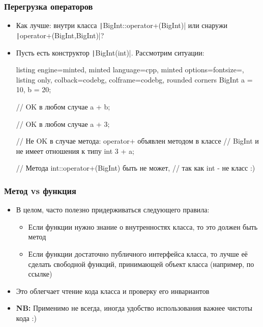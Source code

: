 \documentclass[10pt]{beamer}
\begin{document}
\begin{frame}[fragile]
\frametitle{Перегрузка операторов}
\begin{itemize}
\item Как лучше: внутри класса \texttt|BigInt::operator+(BigInt)| или снаружи \texttt|operator+(BigInt,BigInt)|?
\pause
\item Пусть есть конструктор \texttt|BigInt(int)|. Рассмотрим ситуации:
\begin{tcblisting}{listing engine=minted, minted language=cpp, minted options={fontsize=\scriptsize}, listing only, colback=codebg, colframe=codebg, rounded corners}
BigInt a = 10, b = 20;

// OK в любом случае
a + b;

// OK в любом случае
a + 3;

// Не OK в случае метода: operator+ объявлен методом в классе
// BigInt и не имеет отношения к типу int
3 + a;

// Метода int::operator+(BigInt) быть не может,
// так как int - не класс :)
\end{tcblisting}
\end{itemize}
\end{frame}

\begin{frame}[fragile]
\frametitle{Метод vs функция}
\begin{itemize}
\item В целом, часто полезно придерживаться следующего правила:
\pause
\begin{itemize}
\item Если функции нужно знание о внутренностях класса, то это должен быть метод
\pause
\item Если функции достаточно публичного интерфейса класса, то лучше её сделать свободной функций, принимающей объект класса (например, по ссылке)
\end{itemize}
\pause
\item Это облегчает чтение кода класса и проверку его инвариантов
\pause
\item \textbf{NB:} Применимо не всегда, иногда удобство использования важнее чистоты кода :)
\end{itemize}
\end{frame}
\end{document}
